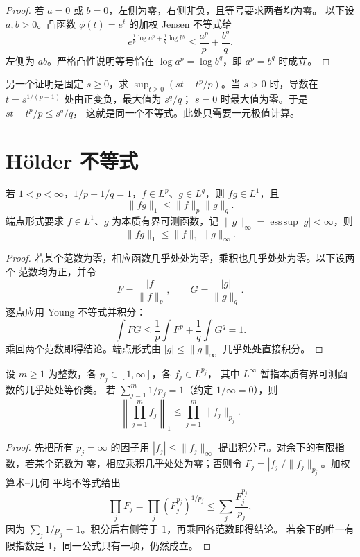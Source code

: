 \begin{proof}
若 \(a=0\) 或 \(b=0\)，左侧为零，右侧非负，且等号要求两者均为零。
以下设 \(a,b>0\)。凸函数 \(\phi(t)=e^t\) 的加权 Jensen 不等式给
\[
 e^{\frac1p\log a^p+\frac1q\log b^q}
 \le\frac{a^p}{p}+\frac{b^q}{q}.
\]
左侧为 \(ab\)。严格凸性说明等号恰在
\(\log a^p=\log b^q\)，即 \(a^p=b^q\) 时成立。
\end{proof}

另一个证明是固定 \(s\ge0\)，求
\(\sup_{t\ge0}(st-t^p/p)\)。当 \(s>0\) 时，导数在
\(t=s^{1/(p-1)}\) 处由正变负，最大值为 \(s^q/q\)；
\(s=0\) 时最大值为零。于是 \(st-t^p/p\le s^q/q\)，
这就是同一个不等式。此处只需要一元极值计算。

\section{Hölder 不等式}

\begin{theorem}[Hölder]
\label{thm:holder}
若 \(1<p<\infty\)，\(1/p+1/q=1\)，\(f\in L^p\)、\(g\in L^q\)，则
\(fg\in L^1\)，且
\[
 \|fg\|_1\le\|f\|_p\|g\|_q.
\]
端点形式要求 \(f\in L^1\)、\(g\) 为本质有界可测函数，记
\(\|g\|_\infty=\operatorname*{ess\,sup}|g|<\infty\)，则
\[
 \|fg\|_1\le\|f\|_1\|g\|_\infty.
\]
\end{theorem}

\begin{proof}
若某个范数为零，相应函数几乎处处为零，乘积也几乎处处为零。以下设两个
范数均为正，并令
\[
 F=\frac{|f|}{\|f\|_p},\qquad
 G=\frac{|g|}{\|g\|_q}.
\]
逐点应用 Young 不等式并积分：
\[
 \int FG\le\frac1p\int F^p+\frac1q\int G^q=1.
\]
乘回两个范数即得结论。端点形式由
\(|g|\le\|g\|_\infty\) 几乎处处直接积分。
\end{proof}

\begin{corollary}[多重 Hölder]
\label{cor:multilinear-holder}
设 \(m\ge1\) 为整数，各 \(p_j\in[1,\infty]\)，各 \(f_j\in L^{p_j}\)，
其中 \(L^\infty\) 暂指本质有界可测函数的几乎处处等价类。
若 \(\sum_{j=1}^m1/p_j=1\)（约定 \(1/\infty=0\)），则
\[
 \left\|\prod_{j=1}^mf_j\right\|_1
 \le\prod_{j=1}^m\|f_j\|_{p_j}.
\]
\end{corollary}

\begin{proof}
先把所有 \(p_j=\infty\) 的因子用
\(|f_j|\le\|f_j\|_\infty\) 提出积分号。对余下的有限指数，若某个范数为
零，相应乘积几乎处处为零；否则令 \(F_j=|f_j|/\|f_j\|_{p_j}\)。加权算术--几何
平均不等式给出
\[
 \prod_jF_j
 =\prod_j(F_j^{p_j})^{1/p_j}
 \le\sum_j\frac{F_j^{p_j}}{p_j},
\]
因为 \(\sum_j1/p_j=1\)。积分后右侧等于 \(1\)，再乘回各范数即得结论。
若余下的唯一有限指数是 \(1\)，同一公式只有一项，仍然成立。
\end{proof}

